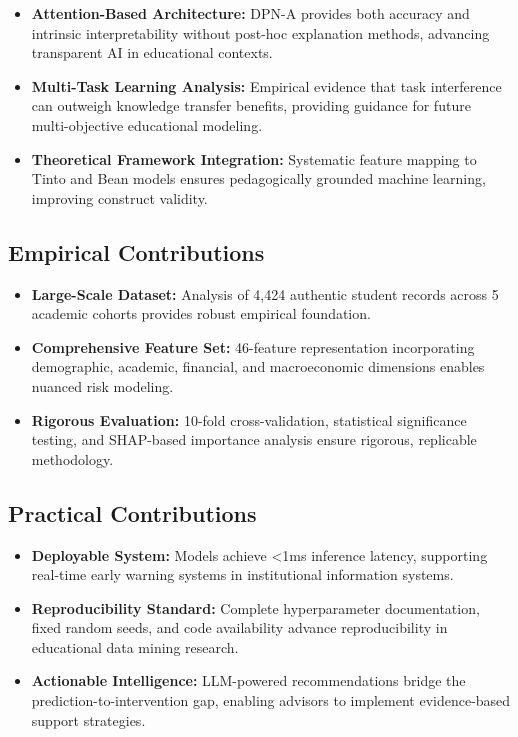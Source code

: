 \begin{itemize}
\item \textbf{Attention-Based Architecture:} DPN-A provides both accuracy and intrinsic interpretability without post-hoc explanation methods, advancing transparent AI in educational contexts.

\item \textbf{Multi-Task Learning Analysis:} Empirical evidence that task interference can outweigh knowledge transfer benefits, providing guidance for future multi-objective educational modeling.

\item \textbf{Theoretical Framework Integration:} Systematic feature mapping to Tinto and Bean models ensures pedagogically grounded machine learning, improving construct validity.
\end{itemize}

\subsection{Empirical Contributions}

\begin{itemize}
\item \textbf{Large-Scale Dataset:} Analysis of 4,424 authentic student records across 5 academic cohorts provides robust empirical foundation.

\item \textbf{Comprehensive Feature Set:} 46-feature representation incorporating demographic, academic, financial, and macroeconomic dimensions enables nuanced risk modeling.

\item \textbf{Rigorous Evaluation:} 10-fold cross-validation, statistical significance testing, and SHAP-based importance analysis ensure rigorous, replicable methodology.
\end{itemize}

\subsection{Practical Contributions}

\begin{itemize}
\item \textbf{Deployable System:} Models achieve <1ms inference latency, supporting real-time early warning systems in institutional information systems.

\item \textbf{Reproducibility Standard:} Complete hyperparameter documentation, fixed random seeds, and code availability advance reproducibility in educational data mining research.

\item \textbf{Actionable Intelligence:} LLM-powered recommendations bridge the prediction-to-intervention gap, enabling advisors to implement evidence-based support strategies.
\end{itemize}

